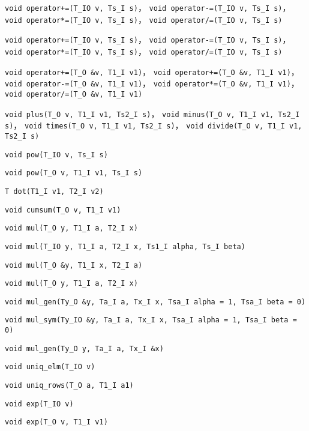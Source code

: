 \verb|void operator+=(T_IO v, Ts_I s)|， \verb|void operator-=(T_IO v, Ts_I s)|， \verb|void operator*=(T_IO v, Ts_I s)|， \verb|void operator/=(T_IO v, Ts_I s)|

\verb|void operator+=(T_IO v, Ts_I s)|， \verb|void operator-=(T_IO v, Ts_I s)|， \verb|void operator*=(T_IO v, Ts_I s)|， \verb|void operator/=(T_IO v, Ts_I s)|

\verb|void operator+=(T_O &v, T1_I v1)|， \verb|void operator+=(T_O &v, T1_I v1)|， \verb|void operator-=(T_O &v, T1_I v1)|， \verb|void operator*=(T_O &v, T1_I v1)|， \verb|void operator/=(T_O &v, T1_I v1)|

\verb|void plus(T_O v, T1_I v1, Ts2_I s)|， \verb|void minus(T_O v, T1_I v1, Ts2_I s)|， \verb|void times(T_O v, T1_I v1, Ts2_I s)|， \verb|void divide(T_O v, T1_I v1, Ts2_I s)|

\verb|void pow(T_IO v, Ts_I s)|

\verb|void pow(T_O v, T1_I v1, Ts_I s)|

\verb|T dot(T1_I v1, T2_I v2)|

\verb|void cumsum(T_O v, T1_I v1)|

\verb|void mul(T_O y, T1_I a, T2_I x)|

\verb|void mul(T_IO y, T1_I a, T2_I x, Ts1_I alpha, Ts_I beta)|

\verb|void mul(T_O &y, T1_I x, T2_I a)|

\verb|void mul(T_O y, T1_I a, T2_I x)|

\verb|void mul_gen(Ty_O &y, Ta_I a, Tx_I x, Tsa_I alpha = 1, Tsa_I beta = 0)|

\verb|void mul_sym(Ty_IO &y, Ta_I a, Tx_I x, Tsa_I alpha = 1, Tsa_I beta = 0)|

\verb|void mul_gen(Ty_O y, Ta_I a, Tx_I &x)|

\verb|void uniq_elm(T_IO v)|

\verb|void uniq_rows(T_O a, T1_I a1)|

\verb|void exp(T_IO v)|

\verb|void exp(T_O v, T1_I v1)|
